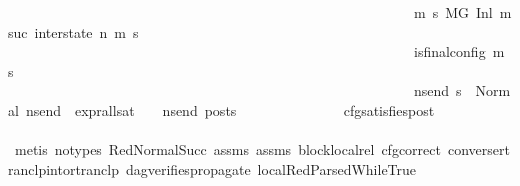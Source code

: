 \begin{isabellebody}
\ \ \ \ \ \ \ \ \ \ \ \ \ \ \ \ \ \ \ \ \ \ \ \ \ \ \ \ \ \ \ \ \ \ \ \ \ \ \ \ \ \ \ \ \ \ \ \ \ \ \ \ \ \ \ \ \ \ {\isacharparenleft}{\kern0pt}{\isasymforall}m{\isacharprime}{\kern0pt}\ s{\isacharprime}{\kern0pt}{\isachardot}{\kern0pt}\ {\isacharparenleft}{\kern0pt}{\isacharparenleft}{\kern0pt}M{\isacharcomma}{\kern0pt}{\isasymLambda}{\isacharcomma}{\kern0pt}{\isasymGamma}{\isacharcomma}{\kern0pt}{\isasymOmega}{\isacharcomma}{\kern0pt}G\ {\isasymturnstile}{\isacharparenleft}{\kern0pt}Inl\ {\isacharparenleft}{\kern0pt}msuc{}{\isacharparenright}{\kern0pt}{\isacharcomma}{\kern0pt}\ inter{\isacharunderscore}{\kern0pt}state{\isacharparenright}{\kern0pt}\ {\isacharminus}{\kern0pt}n{\isasymrightarrow}{\isacharasterisk}{\kern0pt}\ {\isacharparenleft}{\kern0pt}m{\isacharprime}{\kern0pt}{\isacharcomma}{\kern0pt}\ s{\isacharprime}{\kern0pt}{\isacharparenright}{\kern0pt}{\isacharparenright}{\kern0pt}\ {\isasymlongrightarrow}\isanewline
\ \ \ \ \ \ \ \ \ \ \ \ \ \ \ \ \ \ \ \ \ \ \ \ \ \ \ \ \ \ \ \ \ \ \ \ \ \ \ \ \ \ \ \ \ \ \ \ \ \ \ \ \ \ \ \ \ \ is{\isacharunderscore}{\kern0pt}final{\isacharunderscore}{\kern0pt}config\ {\isacharparenleft}{\kern0pt}m{\isacharprime}{\kern0pt}{\isacharcomma}{\kern0pt}\ s{\isacharprime}{\kern0pt}{\isacharparenright}{\kern0pt}\ {\isasymlongrightarrow}\ \isanewline
\ \ \ \ \ \ \ \ \ \ \ \ \ \ \ \ \ \ \ \ \ \ \ \ \ \ \ \ \ \ \ \ \ \ \ \ \ \ \ \ \ \ \ \ \ \ \ \ \ \ \ \ \ \ \ \ \ \ {\isacharparenleft}{\kern0pt}{\isasymforall}ns{\isacharunderscore}{\kern0pt}end{\isachardot}{\kern0pt}\ s{\isacharprime}{\kern0pt}\ {\isacharequal}{\kern0pt}\ Normal\ ns{\isacharunderscore}{\kern0pt}end\ {\isasymlongrightarrow}\ {\isacharparenleft}{\kern0pt}expr{\isacharunderscore}{\kern0pt}all{\isacharunderscore}{\kern0pt}sat\ {\isasymLambda}\ {\isasymGamma}\ {\isasymOmega}\ ns{\isacharunderscore}{\kern0pt}end{\isacharparenright}{\kern0pt}\ posts{\isacharparenright}{\kern0pt}{\isacharparenright}{\kern0pt}{\isacharparenright}{\kern0pt}\ {\isacharparenright}{\kern0pt}{\isachardoublequoteclose}\isanewline
\ \ \ \ \ \ \ \ \ \ \ \ \isamarkupfalse%
\ cfg{\isacharunderscore}{\kern0pt}satisfies{\isacharunderscore}{\kern0pt}post\ \isanewline
\ \ \ \ \ \ \ \ \ \ \ \ \isamarkupfalse%
\ {\isacharparenleft}{\kern0pt}metis\ {\isacharparenleft}{\kern0pt}no{\isacharunderscore}{\kern0pt}types{\isacharparenright}{\kern0pt}\ RedNormalSucc\ assms{\isacharparenleft}{\kern0pt}{}{\isacharparenright}{\kern0pt}\ assms{\isacharparenleft}{\kern0pt}{}{\isacharparenright}{\kern0pt}\ block{\isacharunderscore}{\kern0pt}local{\isacharunderscore}{\kern0pt}rel\ cfg{\isacharunderscore}{\kern0pt}correct\ converse{\isacharunderscore}{\kern0pt}rtranclp{\isacharunderscore}{\kern0pt}into{\isacharunderscore}{\kern0pt}rtranclp\ dag{\isacharunderscore}{\kern0pt}verifies{\isacharunderscore}{\kern0pt}propagate{\isacharunderscore}{\kern0pt}{}\ local{\isachardot}{\kern0pt}RedParsedWhileTrue{\isacharparenleft}{\kern0pt}{}{\isacharparenright}{\kern0pt}{\isacharparenright}{\kern0pt}\isanewline

\end{isabellebody}
